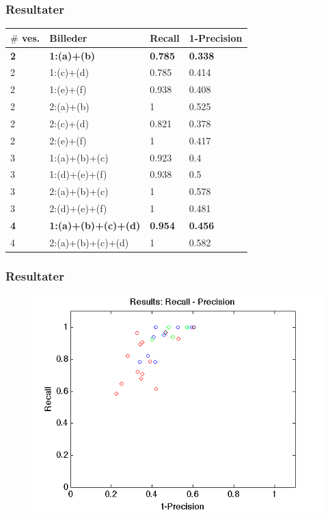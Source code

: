 \documentclass[12pt,t]{beamer}
\begin{document}
\begin{frame}
\frametitle{Resultater}

\begin{table}[H]
	\begin{tabular}{l|l|l|l}
		$\#$ ves. & Billeder & Recall & 1-Precision \\\hline
		\textbf{2}	&	\textbf{1:(a)+(b)}	 							&\textbf{0.785} 	&\textbf{0.338}\\\hline
		2	&	1:(c)+(d)	 							&0.785 	&0.414\\\hline
		2	&	1:(e)+(f)								&0.938 	&0.408\\\hline
		2	&	2:(a)+(b)  					&1 		&0.525\\\hline
		2	&	2:(c)+(d)  					&0.821 	&0.378\\\hline
		2	&	2:(e)+(f)  					&1 		&0.417\\\hline
		3	&	1:(a)+(b)+(c)	 						&0.923 	&0.4\\\hline
		3	&	1:(d)+(e)+(f)	 						&0.938 	&0.5\\\hline
		3	&	2:(a)+(b)+(c)				&1 		&0.578\\\hline
		3	&	2:(d)+(e)+(f)				&1 		&0.481\\\hline
		\textbf{4}	&	\textbf{1:(a)+(b)+(c)+(d)}						&\textbf{0.954} 	&\textbf{0.456}\\\hline
		4	&	2:(a)+(b)+(c)+(d)  			&1 		&0.582\\
	\end{tabular}
\end{table}
\end{frame}

\begin{frame}
\frametitle{Resultater}
\begin{figure}[H]
	\centering
	\includegraphics[scale=0.6]{../files/postmethod/img/recallvsprecision2.png}
\end{figure}
\end{frame}
\end{document}
